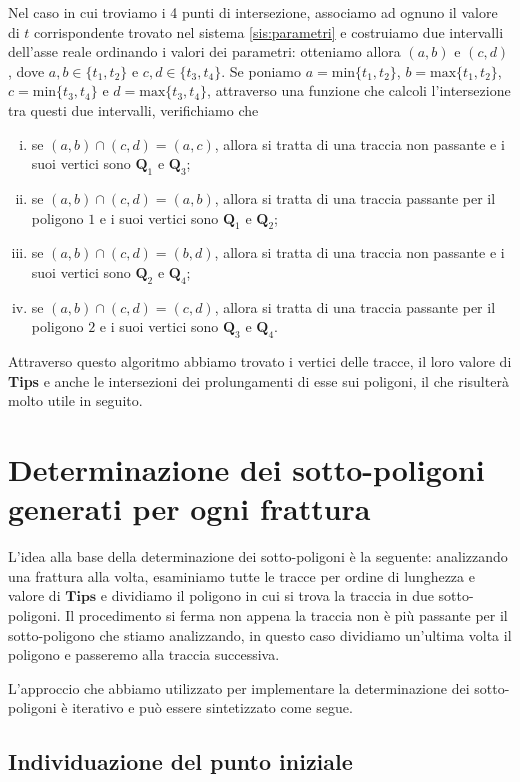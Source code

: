 \documentclass[a4paper]{article}
\newcommand{\B}{\mathbf}
\begin{document}
Nel caso in cui troviamo i 4 punti di intersezione, associamo ad ognuno il valore di $t$ corrispondente trovato nel sistema \eqref{sis:parametri} e costruiamo due intervalli dell'asse reale ordinando i valori dei parametri: otteniamo allora $(a,b)$ e $(c,d)$, dove $a,b\in\{t_1,t_2\}$ e $c,d\in\{t_3,t_4\}$. Se poniamo $a=\text{min}\{t_1,t_2\}$, $b=\text{max}\{t_1,t_2\}$, $c=\text{min}\{t_3,t_4\}$ e $d=\text{max}\{t_3,t_4\}$, attraverso una funzione che calcoli l'intersezione tra questi due intervalli, verifichiamo che
\begin{enumerate} [(i)]
\item se $(a,b)\cap(c,d)=(a,c)$, allora si tratta di una traccia non passante e i suoi vertici sono $\B{Q}_1$ e $\B{Q}_3$;
\item se $(a,b)\cap(c,d)=(a,b)$, allora si tratta di una traccia passante per il poligono $1$ e i suoi vertici sono $\B{Q}_1$ e $\B{Q}_2$;
\item se $(a,b)\cap(c,d)=(b,d)$, allora si tratta di una traccia non passante e i suoi vertici sono $\B{Q}_2$ e $\B{Q}_4$;
\item se $(a,b)\cap(c,d)=(c,d)$, allora si tratta di una traccia passante per il poligono $2$ e i suoi vertici sono $\B{Q}_3$ e $\B{Q}_4$.
\end{enumerate}
Attraverso questo algoritmo abbiamo trovato i vertici delle tracce, il loro valore di \textbf{Tips} e anche le intersezioni dei prolungamenti di esse sui poligoni, il che risulterà molto utile in seguito.

\section{Determinazione dei sotto-poligoni generati per ogni frattura}

L'idea alla base della determinazione dei sotto-poligoni è la seguente: analizzando una frattura alla volta, esaminiamo tutte le tracce per ordine di lunghezza e valore di $\B{Tips}$ e dividiamo il poligono in cui si trova la traccia in due sotto-poligoni. Il procedimento si ferma non appena la traccia non è più passante per il sotto-poligono che stiamo analizzando, in questo caso dividiamo un'ultima volta il poligono e passeremo alla traccia successiva. 

L'approccio che abbiamo utilizzato per implementare la determinazione dei sotto-poligoni è iterativo e può essere sintetizzato come segue.  

\subsection{Individuazione del punto iniziale}
\end{document}
